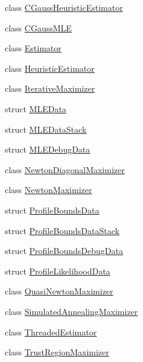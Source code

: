 \begin{DoxyCompactItemize}
\item 
class \hyperlink{classmappel_1_1estimator_1_1CGaussHeuristicEstimator}{C\+Gauss\+Heuristic\+Estimator}
\item 
class \hyperlink{classmappel_1_1estimator_1_1CGaussMLE}{C\+Gauss\+M\+LE}
\item 
class \hyperlink{classmappel_1_1estimator_1_1Estimator}{Estimator}
\item 
class \hyperlink{classmappel_1_1estimator_1_1HeuristicEstimator}{Heuristic\+Estimator}
\item 
class \hyperlink{classmappel_1_1estimator_1_1IterativeMaximizer}{Iterative\+Maximizer}
\item 
struct \hyperlink{namespacemappel_1_1estimator_structmappel_1_1estimator_1_1MLEData}{M\+L\+E\+Data}
\item 
struct \hyperlink{namespacemappel_1_1estimator_structmappel_1_1estimator_1_1MLEDataStack}{M\+L\+E\+Data\+Stack}
\item 
struct \hyperlink{namespacemappel_1_1estimator_structmappel_1_1estimator_1_1MLEDebugData}{M\+L\+E\+Debug\+Data}
\item 
class \hyperlink{classmappel_1_1estimator_1_1NewtonDiagonalMaximizer}{Newton\+Diagonal\+Maximizer}
\item 
class \hyperlink{classmappel_1_1estimator_1_1NewtonMaximizer}{Newton\+Maximizer}
\item 
struct \hyperlink{structmappel_1_1estimator_1_1ProfileBoundsData}{Profile\+Bounds\+Data}
\item 
struct \hyperlink{structmappel_1_1estimator_1_1ProfileBoundsDataStack}{Profile\+Bounds\+Data\+Stack}
\item 
struct \hyperlink{namespacemappel_1_1estimator_structmappel_1_1estimator_1_1ProfileBoundsDebugData}{Profile\+Bounds\+Debug\+Data}
\item 
struct \hyperlink{namespacemappel_1_1estimator_structmappel_1_1estimator_1_1ProfileLikelihoodData}{Profile\+Likelihood\+Data}
\item 
class \hyperlink{classmappel_1_1estimator_1_1QuasiNewtonMaximizer}{Quasi\+Newton\+Maximizer}
\item 
class \hyperlink{classmappel_1_1estimator_1_1SimulatedAnnealingMaximizer}{Simulated\+Annealing\+Maximizer}
\item 
class \hyperlink{classmappel_1_1estimator_1_1ThreadedEstimator}{Threaded\+Estimator}
\item 
class \hyperlink{classmappel_1_1estimator_1_1TrustRegionMaximizer}{Trust\+Region\+Maximizer}
\end{DoxyCompactItemize}
